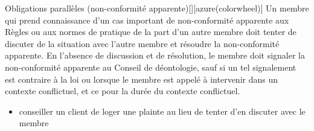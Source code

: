 \documentclass[10pt, french]{article}
\begin{document}
\begin{multicols*}{2}
\begin{definitionGENERAL}{Obligations parallèles (non-conformité apparente)}[][azure(colorwheel)]
Un membre qui prend connaissance d'un cas important de non-conformité apparente aux Règles ou aux normes de pratique de la part d'un autre membre doit tenter de discuter de la situation avec l'autre membre et résoudre la non-conformité apparente. En l'absence de discussion et de résolution, le membre doit signaler la non-conformité apparente au Conseil de déontologie, sauf si un tel signalement est contraire à la loi ou lorsque le membre est appelé à intervenir dans un contexte conflictuel, et ce pour la durée du contexte conflictuel. 

\bigskip

\begin{rappel_enhanced}
\begin{itemize}
	\item	conseiller un client de loger une plainte au lieu de tenter d'en discuter avec le membre
\end{itemize}
\end{rappel_enhanced}
\end{definitionGENERAL}

\end{multicols*}
\end{document}
